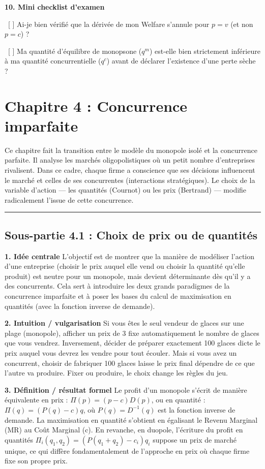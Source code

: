\documentclass[11pt, a4paper]{report}
\begin{document}
\textbf{10. Mini checklist d'examen}
\par \textbullet\ [ ] Ai-je bien vérifié que la dérivée de mon Welfare s'annule pour $p=v$ (et non $p=c$) ?
\par \textbullet\ [ ] Ma quantité d'équilibre de monopsone ($q^m$) est-elle bien strictement inférieure à ma quantité concurrentielle ($q^c$) avant de déclarer l'existence d'une perte sèche ?
\newpage
\chapter{Chapitre 4 : Concurrence imparfaite}

Ce chapitre fait la transition entre le modèle du monopole isolé et la concurrence parfaite. Il analyse les marchés oligopolistiques où un petit nombre d'entreprises rivalisent. Dans ce cadre, chaque firme a conscience que ses décisions influencent le marché et celles de ses concurrentes (interactions stratégiques). Le choix de la variable d'action — les quantités (Cournot) ou les prix (Bertrand) — modifie radicalement l'issue de cette concurrence.

\vspace{1cm}\hrule\vspace{1cm}

\section{Sous-partie 4.1 : Choix de prix ou de quantités}

\textbf{1. Idée centrale}
L'objectif est de montrer que la manière de modéliser l'action d'une entreprise (choisir le prix auquel elle vend ou choisir la quantité qu'elle produit) est neutre pour un monopole, mais devient déterminante dès qu'il y a des concurrents. Cela sert à introduire les deux grands paradigmes de la concurrence imparfaite et à poser les bases du calcul de maximisation en quantités (avec la fonction inverse de demande).

\textbf{2. Intuition / vulgarisation}
Si vous êtes le seul vendeur de glaces sur une plage (monopole), afficher un prix de 3\texteuro{} fixe automatiquement le nombre de glaces que vous vendrez. Inversement, décider de préparer exactement 100 glaces dicte le prix auquel vous devrez les vendre pour tout écouler. Mais si vous avez un concurrent, choisir de fabriquer 100 glaces laisse le prix final dépendre de ce que l'autre va produire. Fixer ou produire, le choix change les règles du jeu.

\textbf{3. Définition / résultat formel}
Le profit d'un monopole s'écrit de manière équivalente en prix : $\Pi(p) = (p-c)D(p)$, ou en quantité : $\Pi(q) = (P(q)-c)q$, où $P(q) = D^{-1}(q)$ est la fonction inverse de demande. 
La maximisation en quantité s'obtient en égalisant le Revenu Marginal (MR) au Coût Marginal (c). 
En revanche, en duopole, l'écriture du profit en quantités $\Pi_i(q_1, q_2) = (P(q_1+q_2)-c_i)q_i$ suppose un prix de marché unique, ce qui diffère fondamentalement de l'approche en prix où chaque firme fixe son propre prix.
\end{document}
